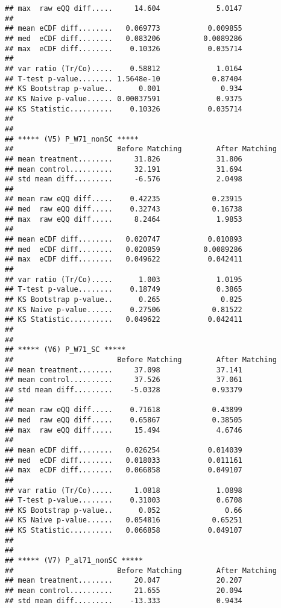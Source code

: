 \documentclass[
]{article}
\begin{document}
\begin{verbatim}
## max  raw eQQ diff.....     14.604             5.0147 
## 
## mean eCDF diff........   0.069773           0.009855 
## med  eCDF diff........   0.083206          0.0089286 
## max  eCDF diff........    0.10326           0.035714 
## 
## var ratio (Tr/Co).....    0.58812             1.0164 
## T-test p-value........ 1.5648e-10            0.87404 
## KS Bootstrap p-value..      0.001              0.934 
## KS Naive p-value...... 0.00037591             0.9375 
## KS Statistic..........    0.10326           0.035714 
## 
## 
## ***** (V5) P_W71_nonSC *****
##                        Before Matching        After Matching
## mean treatment........     31.826             31.806 
## mean control..........     32.191             31.694 
## std mean diff.........     -6.576             2.0498 
## 
## mean raw eQQ diff.....    0.42235            0.23915 
## med  raw eQQ diff.....    0.32743            0.16738 
## max  raw eQQ diff.....     8.2464             1.9853 
## 
## mean eCDF diff........   0.020747           0.010893 
## med  eCDF diff........   0.020859          0.0089286 
## max  eCDF diff........   0.049622           0.042411 
## 
## var ratio (Tr/Co).....      1.003             1.0195 
## T-test p-value........    0.18749             0.3865 
## KS Bootstrap p-value..      0.265              0.825 
## KS Naive p-value......    0.27506            0.81522 
## KS Statistic..........   0.049622           0.042411 
## 
## 
## ***** (V6) P_W71_SC *****
##                        Before Matching        After Matching
## mean treatment........     37.098             37.141 
## mean control..........     37.526             37.061 
## std mean diff.........    -5.0328            0.93379 
## 
## mean raw eQQ diff.....    0.71618            0.43899 
## med  raw eQQ diff.....    0.65867            0.38505 
## max  raw eQQ diff.....     15.494             4.6746 
## 
## mean eCDF diff........   0.026254           0.014039 
## med  eCDF diff........   0.018033           0.011161 
## max  eCDF diff........   0.066858           0.049107 
## 
## var ratio (Tr/Co).....     1.0818             1.0898 
## T-test p-value........    0.31003             0.6708 
## KS Bootstrap p-value..      0.052               0.66 
## KS Naive p-value......   0.054816            0.65251 
## KS Statistic..........   0.066858           0.049107 
## 
## 
## ***** (V7) P_al71_nonSC *****
##                        Before Matching        After Matching
## mean treatment........     20.047             20.207 
## mean control..........     21.655             20.094 
## std mean diff.........    -13.333             0.9434 

\end{verbatim}
\end{document}
